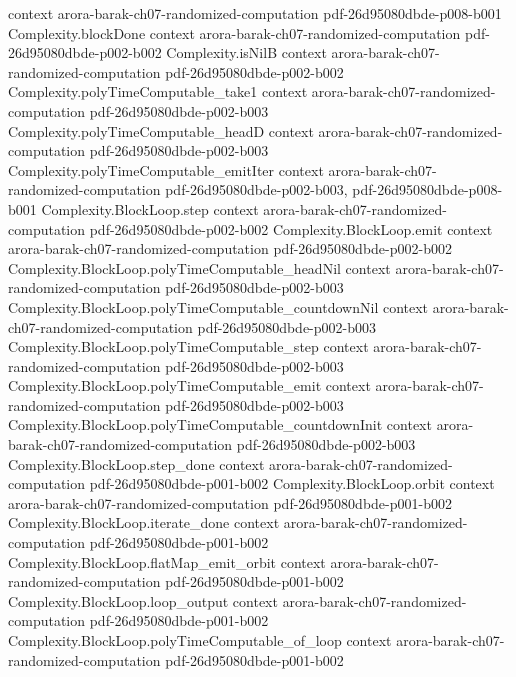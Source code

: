 \begin{theorem}
  {context}
  {arora-barak-ch07-randomized-computation}
  {pdf-26d95080dbde-p008-b001}
\proofstep
  {Complexity.blockDone}
  {context}
  {arora-barak-ch07-randomized-computation}
  {pdf-26d95080dbde-p002-b002}
\proofstep
  {Complexity.isNilB}
  {context}
  {arora-barak-ch07-randomized-computation}
  {pdf-26d95080dbde-p002-b002}
\proofstep
  {Complexity.polyTimeComputable_take1}
  {context}
  {arora-barak-ch07-randomized-computation}
  {pdf-26d95080dbde-p002-b003}
\proofstep
  {Complexity.polyTimeComputable_headD}
  {context}
  {arora-barak-ch07-randomized-computation}
  {pdf-26d95080dbde-p002-b003}
\proofstep
  {Complexity.polyTimeComputable_emitIter}
  {context}
  {arora-barak-ch07-randomized-computation}
  {pdf-26d95080dbde-p002-b003,
    pdf-26d95080dbde-p008-b001}
\proofstep
  {Complexity.BlockLoop.step}
  {context}
  {arora-barak-ch07-randomized-computation}
  {pdf-26d95080dbde-p002-b002}
\proofstep
  {Complexity.BlockLoop.emit}
  {context}
  {arora-barak-ch07-randomized-computation}
  {pdf-26d95080dbde-p002-b002}
\proofstep
  {Complexity.BlockLoop.polyTimeComputable_headNil}
  {context}
  {arora-barak-ch07-randomized-computation}
  {pdf-26d95080dbde-p002-b003}
\proofstep
  {Complexity.BlockLoop.polyTimeComputable_countdownNil}
  {context}
  {arora-barak-ch07-randomized-computation}
  {pdf-26d95080dbde-p002-b003}
\proofstep
  {Complexity.BlockLoop.polyTimeComputable_step}
  {context}
  {arora-barak-ch07-randomized-computation}
  {pdf-26d95080dbde-p002-b003}
\proofstep
  {Complexity.BlockLoop.polyTimeComputable_emit}
  {context}
  {arora-barak-ch07-randomized-computation}
  {pdf-26d95080dbde-p002-b003}
\proofstep
  {Complexity.BlockLoop.polyTimeComputable_countdownInit}
  {context}
  {arora-barak-ch07-randomized-computation}
  {pdf-26d95080dbde-p002-b003}
\proofstep
  {Complexity.BlockLoop.step_done}
  {context}
  {arora-barak-ch07-randomized-computation}
  {pdf-26d95080dbde-p001-b002}
\proofstep
  {Complexity.BlockLoop.orbit}
  {context}
  {arora-barak-ch07-randomized-computation}
  {pdf-26d95080dbde-p001-b002}
\proofstep
  {Complexity.BlockLoop.iterate_done}
  {context}
  {arora-barak-ch07-randomized-computation}
  {pdf-26d95080dbde-p001-b002}
\proofstep
  {Complexity.BlockLoop.flatMap_emit_orbit}
  {context}
  {arora-barak-ch07-randomized-computation}
  {pdf-26d95080dbde-p001-b002}
\proofstep
  {Complexity.BlockLoop.loop_output}
  {context}
  {arora-barak-ch07-randomized-computation}
  {pdf-26d95080dbde-p001-b002}
\proofstep
  {Complexity.BlockLoop.polyTimeComputable_of_loop}
  {context}
  {arora-barak-ch07-randomized-computation}
  {pdf-26d95080dbde-p001-b002}

\end{theorem}
